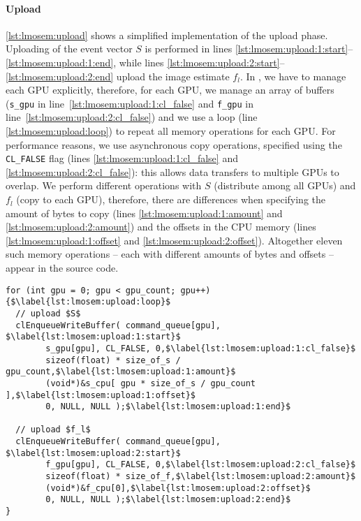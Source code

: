 \paragraph{Upload}
\autoref{lst:lmosem:upload} shows a simplified \OpenCL implementation of the upload phase.
Uploading of the event vector $S$ is performed in lines \autoref{lst:lmosem:upload:1:start}--\autoref{lst:lmosem:upload:1:end}, while lines \autoref{lst:lmosem:upload:2:start}--\autoref{lst:lmosem:upload:2:end} upload the image estimate $f_l$.
In \OpenCL, we have to manage each GPU explicitly, therefore, for each GPU, we manage an array of buffers (\texttt{s\_gpu} in line~\autoref{lst:lmosem:upload:1:cl_false} and \texttt{f\_gpu} in line~\autoref{lst:lmosem:upload:2:cl_false}) and we use a loop (line \autoref{lst:lmosem:upload:loop}) to repeat all memory operations for each GPU.
For performance reasons, we use asynchronous copy operations, specified using the \texttt{CL\_FALSE} flag (lines \autoref{lst:lmosem:upload:1:cl_false} and \autoref{lst:lmosem:upload:2:cl_false}): this allows data transfers to multiple GPUs to overlap.
We perform different operations with $S$ (distribute among all GPUs) and $f_l$ (copy to each GPU), therefore, there are differences when specifying the amount of bytes to copy (lines \autoref{lst:lmosem:upload:1:amount} and \autoref{lst:lmosem:upload:2:amount}) and the offsets in the CPU memory (lines \autoref{lst:lmosem:upload:1:offset} and \autoref{lst:lmosem:upload:2:offset}).
Altogether eleven such memory operations -- each with different amounts of bytes and offsets -- appear in the \OpenCL source code.

\begin{lstlisting}[float,
  caption={Implementation of the upload phase in \OpenCL (omitting error checks for brevity)},
  label={lst:lmosem:upload}]
for (int gpu = 0; gpu < gpu_count; gpu++) {$\label{lst:lmosem:upload:loop}$
  // upload $S$
  clEnqueueWriteBuffer( command_queue[gpu], $\label{lst:lmosem:upload:1:start}$
        s_gpu[gpu], CL_FALSE, 0,$\label{lst:lmosem:upload:1:cl_false}$
        sizeof(float) * size_of_s / gpu_count,$\label{lst:lmosem:upload:1:amount}$
        (void*)&s_cpu[ gpu * size_of_s / gpu_count ],$\label{lst:lmosem:upload:1:offset}$
        0, NULL, NULL );$\label{lst:lmosem:upload:1:end}$

  // upload $f_l$
  clEnqueueWriteBuffer( command_queue[gpu], $\label{lst:lmosem:upload:2:start}$
        f_gpu[gpu], CL_FALSE, 0,$\label{lst:lmosem:upload:2:cl_false}$
        sizeof(float) * size_of_f,$\label{lst:lmosem:upload:2:amount}$
        (void*)&f_cpu[0],$\label{lst:lmosem:upload:2:offset}$
        0, NULL, NULL );$\label{lst:lmosem:upload:2:end}$
}
\end{lstlisting}

